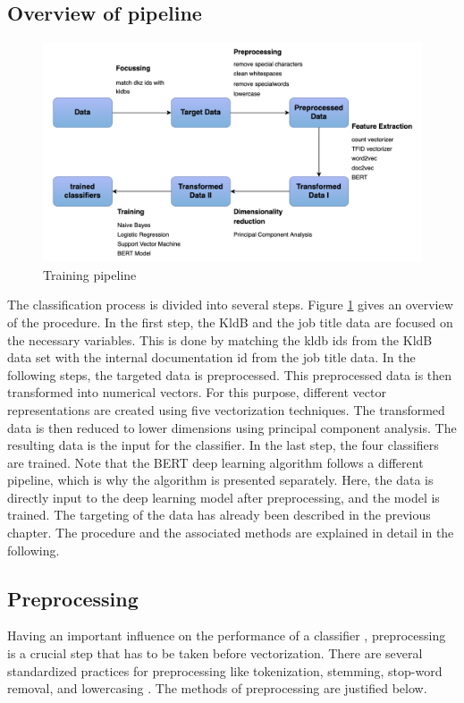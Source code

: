 \documentclass[12pt, a4paper, titlepage]{article}
\begin{document}
\subsection{Overview of pipeline}

\begin{figure}[]
  \center
  \includegraphics[scale=0.5]{pipeline_MA.png}
  \caption{\label{fig: F8} Training pipeline}
\end{figure}

The classification process is divided into several steps. Figure \ref{fig: F8} gives an overview of the procedure. In the first step, the \ac{KldB} and the job title data are focused on the necessary variables. This is done by matching the kldb ids from the \ac{KldB} data set with the internal documentation id from the job title data. In the following steps, the targeted data is preprocessed. This preprocessed data is then transformed into numerical vectors. For this purpose, different vector representations are created using five vectorization techniques. The transformed data is then reduced to lower dimensions using principal component analysis. The resulting data is the input for the classifier. In the last step, the four classifiers are trained. Note that the \ac{BERT} deep learning algorithm follows a different pipeline, which is why the algorithm is presented separately. Here, the data is directly input to the deep learning model after preprocessing, and the model is trained. The targeting of the data has already been described in the previous chapter. The procedure and the associated methods are explained in detail in the following.

\subsection{Preprocessing}
Having an important influence on the performance of a classifier \citep{uysal2014, hacohen2020, gonccalves2005}, preprocessing is a crucial step that has to be taken before vectorization. There are several standardized practices for preprocessing like tokenization, stemming, stop-word removal, and lowercasing \citep{alsmadi2019}. The methods of preprocessing are justified below.
\end{document}
